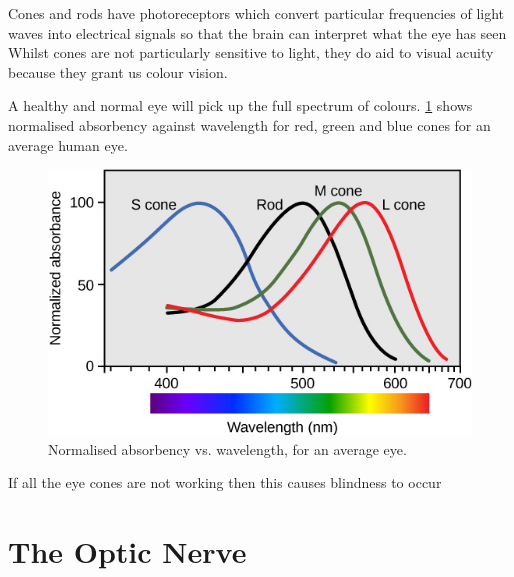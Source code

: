 Cones and rods have photoreceptors which convert particular frequencies of
light waves into electrical signals so that the brain can interpret what
the eye has seen Whilst cones are not particularly sensitive to light,
they do aid to visual acuity because they grant us colour vision.\cite{}

A healthy and normal eye will pick up the full spectrum of colours.
 \ref{fig:wavelengths} shows normalised absorbency against wavelength
 for red, green and blue cones for an average human eye.

\begin{figure}[htbp]
  \centering
    \includegraphics{figures/wavelengths}
  \caption{Normalised absorbency vs. wavelength, for an average eye.}
  \label{fig:wavelengths}
\end{figure}

If all the eye cones are not working then this causes blindness to occur\cite{}

\section{The Optic Nerve}
